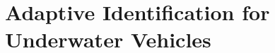 \chapter{Adaptive Identification for Underwater Vehicles}
\label{chUV_AID}
\acresetall





%



%

%
%



